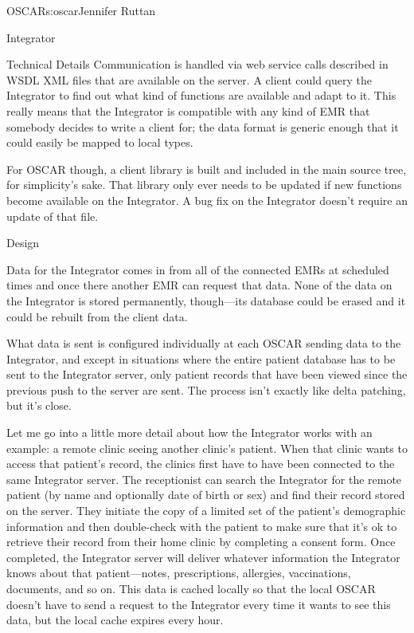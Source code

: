 \begin{aosachapter}{OSCAR}{s:oscar}{Jennifer Ruttan}
\begin{aosasect1}{Integrator}
\begin{aosasect2}{Technical Details}
Communication is handled via web service calls described in WSDL XML
files that are available on the server. A client could query the
Integrator to find out what kind of functions are available and adapt
to it. This really means that the Integrator is compatible with any
kind of EMR that somebody decides to write a client for; the data
format is generic enough that it could easily be mapped to local
types.

For OSCAR though, a client library is built and included in the main
source tree, for simplicity's sake. That library only ever needs to be
updated if new functions become available on the Integrator. A bug fix
on the Integrator doesn't require an update of that file.

\end{aosasect2}

\begin{aosasect2}{Design}

Data for the Integrator comes in from all of the connected EMRs at
scheduled times and once there another EMR can request that data. None
of the data on the Integrator is stored permanently, though---its
database could be erased and it could be rebuilt from the client data.

What data is sent is configured individually at each OSCAR sending
data to the Integrator, and except in situations where the entire
patient database has to be sent to the Integrator server, only patient
records that have been viewed since the previous push to the server
are sent. The process isn't exactly like delta patching, but it's
close.


Let me go into a little more detail about how the Integrator works
with an example: a remote clinic seeing another clinic's patient. When
that clinic wants to access that patient's record, the clinics first
have to have been connected to the same Integrator server. The
receptionist can search the Integrator for the remote patient (by name
and optionally date of birth or sex) and find their record stored on
the server. They initiate the copy of a limited set of the patient's
demographic information and then double-check with the patient to make
sure that it's ok to retrieve their record from their home clinic by
completing a consent form. Once completed, the Integrator server will
deliver whatever information the Integrator knows about that
patient---notes, prescriptions, allergies, vaccinations, documents,
and so on. This data is cached locally so that the local OSCAR doesn't
have to send a request to the Integrator every time it wants to see
this data, but the local cache expires every hour.


\end{aosasect2}
\end{aosasect1}
\end{aosachapter}

